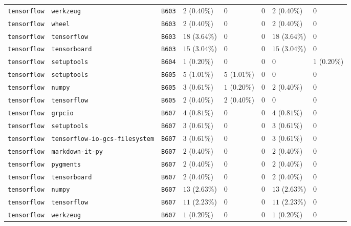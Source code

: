 \begin{table}
\begin{tabular}{llllllll}
\texttt{tensorflow} & \texttt{werkzeug} & \texttt{B603} & $2$ ($0.40\%$) & $0$ & $0$ & $2$ ($0.40\%$) & $0$ \\
\texttt{tensorflow} & \texttt{wheel} & \texttt{B603} & $2$ ($0.40\%$) & $0$ & $0$ & $2$ ($0.40\%$) & $0$ \\
\texttt{tensorflow} & \texttt{tensorflow} & \texttt{B603} & $18$ ($3.64\%$) & $0$ & $0$ & $18$ ($3.64\%$) & $0$ \\
\texttt{tensorflow} & \texttt{tensorboard} & \texttt{B603} & $15$ ($3.04\%$) & $0$ & $0$ & $15$ ($3.04\%$) & $0$ \\
\texttt{tensorflow} & \texttt{setuptools} & \texttt{B604} & $1$ ($0.20\%$) & $0$ & $0$ & $0$ & $1$ ($0.20\%$) \\
\texttt{tensorflow} & \texttt{setuptools} & \texttt{B605} & $5$ ($1.01\%$) & $5$ ($1.01\%$) & $0$ & $0$ & $0$ \\
\texttt{tensorflow} & \texttt{numpy} & \texttt{B605} & $3$ ($0.61\%$) & $1$ ($0.20\%$) & $0$ & $2$ ($0.40\%$) & $0$ \\
\texttt{tensorflow} & \texttt{tensorflow} & \texttt{B605} & $2$ ($0.40\%$) & $2$ ($0.40\%$) & $0$ & $0$ & $0$ \\
\texttt{tensorflow} & \texttt{grpcio} & \texttt{B607} & $4$ ($0.81\%$) & $0$ & $0$ & $4$ ($0.81\%$) & $0$ \\
\texttt{tensorflow} & \texttt{setuptools} & \texttt{B607} & $3$ ($0.61\%$) & $0$ & $0$ & $3$ ($0.61\%$) & $0$ \\
\texttt{tensorflow} & \texttt{tensorflow-io-gcs-filesystem} & \texttt{B607} & $3$ ($0.61\%$) & $0$ & $0$ & $3$ ($0.61\%$) & $0$ \\
\texttt{tensorflow} & \texttt{markdown-it-py} & \texttt{B607} & $2$ ($0.40\%$) & $0$ & $0$ & $2$ ($0.40\%$) & $0$ \\
\texttt{tensorflow} & \texttt{pygments} & \texttt{B607} & $2$ ($0.40\%$) & $0$ & $0$ & $2$ ($0.40\%$) & $0$ \\
\texttt{tensorflow} & \texttt{tensorboard} & \texttt{B607} & $2$ ($0.40\%$) & $0$ & $0$ & $2$ ($0.40\%$) & $0$ \\
\texttt{tensorflow} & \texttt{numpy} & \texttt{B607} & $13$ ($2.63\%$) & $0$ & $0$ & $13$ ($2.63\%$) & $0$ \\
\texttt{tensorflow} & \texttt{tensorflow} & \texttt{B607} & $11$ ($2.23\%$) & $0$ & $0$ & $11$ ($2.23\%$) & $0$ \\
\texttt{tensorflow} & \texttt{werkzeug} & \texttt{B607} & $1$ ($0.20\%$) & $0$ & $0$ & $1$ ($0.20\%$) & $0$ \\
\bottomrule
\end{tabular}
\end{table}
